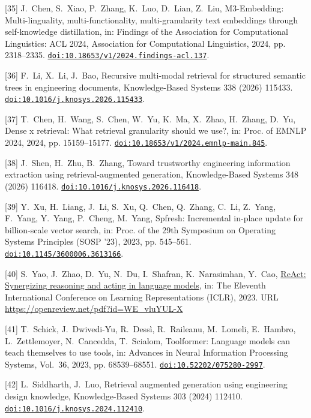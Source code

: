 [35] J.~Chen, S.~Xiao, P.~Zhang, K.~Luo, D.~Lian, Z.~Liu, {M3-Embedding}: Multi-linguality, multi-functionality, multi-granularity text embeddings through self-knowledge distillation, in: Findings of the Association for Computational Linguistics: ACL 2024, Association for Computational Linguistics, 2024, pp. 2318--2335. \href {https://doi.org/10.18653/v1/2024.findings-acl.137} {\texttt{doi:10.18653/v1/2024.findings-acl.137}}.

[36] F.~Li, X.~Li, J.~Bao, Recursive multi-modal retrieval for structured semantic trees in engineering documents, Knowledge-Based Systems 338 (2026) 115433. \href {https://doi.org/10.1016/j.knosys.2026.115433} {\texttt{doi:10.1016/j.knosys.2026.115433}}.

[37] T.~Chen, H.~Wang, S.~Chen, W.~Yu, K.~Ma, X.~Zhao, H.~Zhang, D.~Yu, Dense x retrieval: What retrieval granularity should we use?, in: Proc. of EMNLP 2024, 2024, pp. 15159--15177. \href {https://doi.org/10.18653/v1/2024.emnlp-main.845} {\texttt{doi:10.18653/v1/2024.emnlp-main.845}}.

[38] J.~Shen, H.~Zhu, B.~Zhang, Toward trustworthy engineering information extraction using retrieval-augmented generation, Knowledge-Based Systems 348 (2026) 116418. \href {https://doi.org/10.1016/j.knosys.2026.116418} {\texttt{doi:10.1016/j.knosys.2026.116418}}.

[39] Y.~Xu, H.~Liang, J.~Li, S.~Xu, Q.~Chen, Q.~Zhang, C.~Li, Z.~Yang, F.~Yang, Y.~Yang, P.~Cheng, M.~Yang, Spfresh: Incremental in-place update for billion-scale vector search, in: Proc. of the 29th Symposium on Operating Systems Principles (SOSP '23), 2023, pp. 545--561. \href {https://doi.org/10.1145/3600006.3613166} {\texttt{doi:10.1145/3600006.3613166}}.

[40] S.~Yao, J.~Zhao, D.~Yu, N.~Du, I.~Shafran, K.~Narasimhan, Y.~Cao, \href{https://openreview.net/pdf?id=WE_vluYUL-X}{{ReAct}: Synergizing reasoning and acting in language models}, in: The Eleventh International Conference on Learning Representations ({ICLR}), 2023. URL \url{https://openreview.net/pdf?id=WE_vluYUL-X}

[41] T.~Schick, J.~Dwivedi-Yu, R.~Dess{\`i}, R.~Raileanu, M.~Lomeli, E.~Hambro, L.~Zettlemoyer, N.~Cancedda, T.~Scialom, Toolformer: Language models can teach themselves to use tools, in: Advances in Neural Information Processing Systems, Vol.~36, 2023, pp. 68539--68551. \href {https://doi.org/10.52202/075280-2997} {\texttt{doi:10.52202/075280-2997}}.

[42] L.~Siddharth, J.~Luo, {Retrieval augmented generation using engineering design knowledge}, Knowledge-Based Systems 303 (2024) 112410. \href {https://doi.org/10.1016/j.knosys.2024.112410} {\texttt{doi:10.1016/j.knosys.2024.112410}}.

